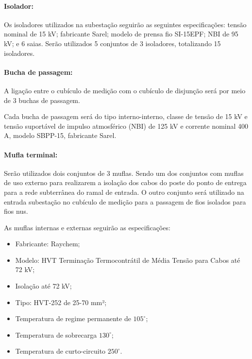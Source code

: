 \paragraph{Isolador:}

Os isoladores utilizados na subestação seguirão as seguintes especificações: tensão nominal de 15 kV; fabricante Sarel; modelo de prensa fio SI-15EPF; NBI de 95 kV; e 6 saias. Serão utilizados 5 conjuntos de 3 isoladores, totalizando 15 isoladores.

\paragraph{Bucha de passagem:}

A ligação entre o cubículo de medição com o cubículo de disjunção será por meio de 3 buchas de passagem.


Cada bucha de passagem será do tipo interno-interno, classe de tensão de 15 kV e tensão suportável de impulso atmosférico (NBI) de 125 kV e corrente nominal 400 A, modelo SBPP-15, fabricante Sarel.


\paragraph{Mufla terminal:}

Serão utilizados dois conjuntos de 3 muflas. Sendo um dos conjuntos com muflas de uso externo para realizarem a isolação dos cabos do poste do ponto de entrega para a rede subterrânea do ramal de entrada. O outro conjunto será utilizado na entrada subestação no cubículo de medição para a passagem de fios isolados para fios nus.

As muflas internas e externas seguirão as especificações:
\begin{itemize}
    \item Fabricante: Raychem;
    \item Modelo: HVT Terminação Termocontrátil de Média Tensão para Cabos até 72 kV;
    \item Isolação até 72 kV; 
    \item Tipo: HVT-252 de 25-70 mm²;
    \item Temperatura de regime permanente de $105^{\circ}$;
    \item Temperatura de sobrecarga $130^{\circ}$;
    \item Temperatura de curto-circuito $250^{\circ}$.
\end{itemize}
